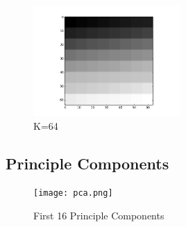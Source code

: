 \documentclass[conference]{IEEEtran}
\begin{document}
    \begin{figure}[htbp]
        \centerline{\includegraphics[width=0.5\textwidth]{64.png}}
        \caption{K=64}
        \label{k64}
    \end{figure}

    \subsection{Principle Components}

    \begin{figure}[htbp]
        \centerline{\texttt{[image: pca.png]}}
        \caption{First 16 Principle Components}
        \label{pca}
    \end{figure}
\end{document}
